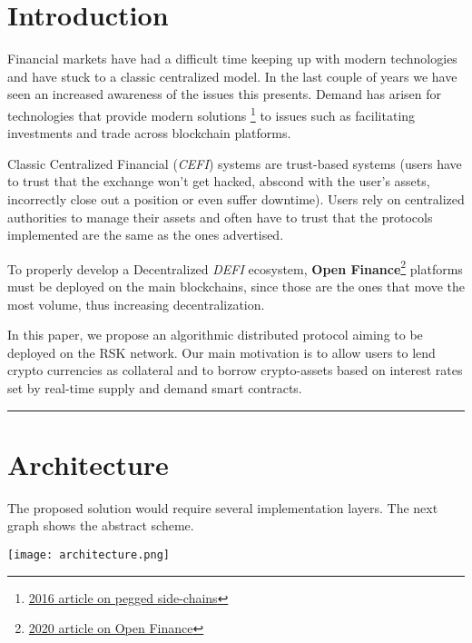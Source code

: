 \documentclass{article}
\begin{document}
\section*{Introduction}
Financial markets have had a difficult time keeping up with modern technologies and have stuck to a classic centralized model. In the last couple of years we have seen an increased awareness of the issues this presents. Demand has arisen for technologies that provide modern solutions \footnote{\href{https://blog.rsk.co/noticia/the-cutting-edge-of-sidechains-liquid-and-rsk/}{2016 article on pegged side-chains}} to issues such as facilitating investments and trade across blockchain platforms.

Classic Centralized Financial (\textit{CEFI}) systems are trust-based systems (users have to trust that the exchange won't get hacked, abscond with the user's assets, incorrectly close out a position or even suffer downtime). Users rely on centralized authorities to manage their assets and often have to trust that the protocols implemented are the same as the ones advertised.

To properly develop a Decentralized \textit{DEFI} ecosystem, \textbf{Open Finance}\footnote{\href{https://blog.rsk.co/noticia/open-finance-defi-rsk-a-definitive-guide/}{2020 article on Open Finance}} platforms must be deployed on the main blockchains, since those are the ones that move the most volume, thus increasing decentralization.

In this paper, we propose an algorithmic distributed protocol aiming to be deployed on the RSK network. Our main motivation is to allow users to lend crypto currencies as collateral and to borrow crypto-assets based on interest rates set by real-time supply and demand smart contracts.

\begin{center}
\noindent\rule{8cm}{0.4pt}
\end{center}

\section{Architecture}

The proposed solution would require several implementation layers. The next graph shows the abstract scheme.

\begin{center}
\texttt{[image: architecture.png]}
\end{center}
\end{document}
